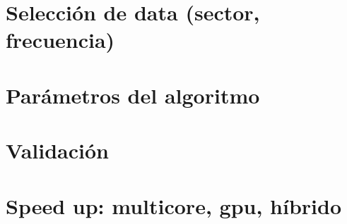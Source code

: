 \section{Selección de data (sector, frecuencia)}
\section{Parámetros del algoritmo}
\section{Validación}
\section{Speed up: multicore, gpu, híbrido}
